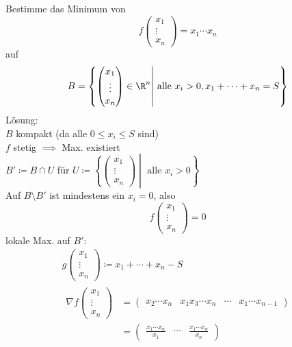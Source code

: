 \begin{bsp*}
	Bestimme das Minimum von \\
	\[ f\begin{pmatrix} x_1 \\ \vdots \\ x_n \end{pmatrix} = x_1 \cdots x_n \]
	auf
	\[ B = \left\{ \begin{pmatrix} x_1 \\ \vdots \\ x_n \end{pmatrix} \in \R^n \middle| \text{ alle } x_i > 0 , x_1 + \dotsb + x_n = S \right\} \]
	Lösung: \\
	$B$ kompakt (da alle $0 \leq x_i \leq S$ sind) \\
	$f$ stetig $\implies$ Max. existiert \\
	$B' \coloneqq B \cap U$ für $U \coloneqq \left\{ \begin{pmatrix} x_1 \\ \vdots \\ x_n \end{pmatrix} \middle| \text{ alle } x_i > 0 \right\}$ \\
	Auf $B \setminus B'$ ist mindestens ein $x_i = 0$, also
	\[ f\begin{pmatrix} x_1 \\ \vdots \\ x_n \end{pmatrix} = 0 \]
	lokale Max. auf $B'$:
	\begin{gather*}
		g\begin{pmatrix} x_1 \\ \vdots \\ x_n \end{pmatrix} \coloneqq x_1 + \dotsb + x_n - S \\
		\begin{split}
			\nabla f\begin{pmatrix} x_1 \\ \vdots \\ x_n \end{pmatrix}
				&= \begin{pmatrix} x_2 \cdots x_n &x_1 x_3 \cdots x_n &\cdots &x_1 \cdots x_{n-1} \end{pmatrix} \\
				&= \begin{pmatrix} \frac{x_1 \cdots x_n}{x_1} &\cdots &\frac{x_1 \cdots x_n}{x_n} \end{pmatrix}
		\end{split} \\

\end{gather*}
\end{bsp*}
